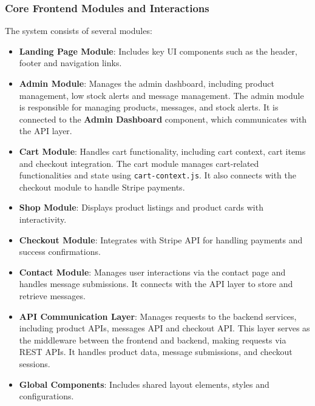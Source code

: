 \subsubsection{Core Frontend Modules and Interactions}
The system consists of several modules:
\begin{itemize}
    \item \textbf{Landing Page Module}: Includes key UI components such as the header, footer and navigation links.
    \item \textbf{Admin Module}: Manages the admin dashboard, including product management, low stock alerts and message management. The admin module is responsible for managing products, messages, and stock alerts. It is connected to the \textbf{Admin Dashboard} component, which communicates with the API layer.
    \item \textbf{Cart Module}: Handles cart functionality, including cart context, cart items and checkout integration. The cart module manages cart-related functionalities and state using \texttt{cart-context.js}. It also connects with the checkout module to handle Stripe payments.
    \item \textbf{Shop Module}: Displays product listings and product cards with interactivity.
    \item \textbf{Checkout Module}: Integrates with Stripe API for handling payments and success confirmations.
    \item \textbf{Contact Module}: Manages user interactions via the contact page and handles message submissions. It connects with the API layer to store and retrieve messages.
    \item \textbf{API Communication Layer}: Manages requests to the backend services, including product APIs, messages API and checkout API. This layer serves as the middleware between the frontend and backend, making requests via REST APIs. It handles product data, message submissions, and checkout sessions.
    \item \textbf{Global Components}: Includes shared layout elements, styles and configurations.
\end{itemize}

